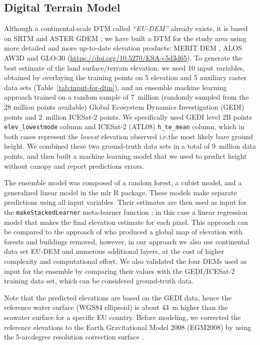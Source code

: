 \subsection*{Digital Terrain Model}

Although a continental-scale DTM called \emph{``EU-DEM''} already exists, it is based on SRTM and ASTER GDEM \citep{jozsa2014evaluation}; we have built a DTM for the study area using more detailed and more up-to-date elevation products: MERIT DEM \citep{yamazaki2019merit}, ALOS AW3D \citep{takaku2018quality} and GLO-30 (\url{https://doi.org/10.5270/ESA-c5d3d65}). To generate the best estimate of the land surface/terrain elevation, we used 10 input variables, obtained by overlaying the training points on 5 elevation and 5 auxiliary raster data sets (Table~\ref{tab:input-for-dtm}), and an ensemble machine learning approach trained on a random sample of 7~million (randomly sampled from the 28 million points available) Global Ecosystem Dynamics Investigation (GEDI) points and 2~million ICESat-2 points. We specifically used GEDI level 2B points \verb"elev_lowestmode" column and ICESat-2 (ATL08) \verb"h_te_mean" column, which in both cases represent the \emph{lowest} elevation observed i.e.\@ the most likely bare ground height. We combined these two ground-truth data sets in a total of 9~million data points, and then built a machine learning model that we used to predict height without canopy and report predictions errors.

The ensemble model was composed of a random forest, a cubist model, and a generalized linear model in the \textsf{mlr} R package. These models make separate predictions using all input variables. Their estimates are then used as input for the \texttt{makeStackedLearner} meta-learner function \citep{bischl2016mlr}; in this case a linear regression model that makes the final elevation estimate for each pixel. This approach can be compared to the approach of \citet{hawker202230} who produced a global map of elevation with forests and buildings removed, however, in our approach we also use continental data set EU-DEM and numerous additional layers, at the cost of higher complexity and computational effort. We also validated the four DEMs used as input for the ensemble by comparing their values with the GEDI/ICESat-2 training data set, which can be considered ground-truth data.

Note that the predicted elevations are based on the GEDI data, hence the reference water surface (WGS84 ellipsoid) is about 43~m higher than the seawater surface for a specific EU country. Before modeling, we corrected the reference elevations to the Earth Gravitational Model 2008 (EGM2008) by using the 5-arcdegree resolution correction surface \citep{pavlis2012development}. 

